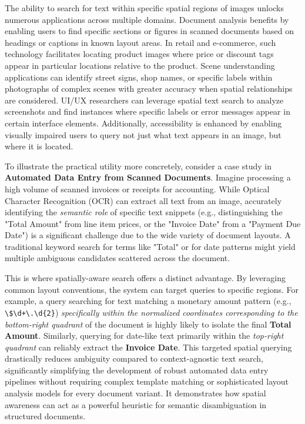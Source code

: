 \documentclass[sigconf,screen]{acmart}
\begin{document}
The ability to search for text within specific spatial regions of images unlocks numerous applications across multiple domains. Document analysis benefits by enabling users to find specific sections or figures in scanned documents based on headings or captions in known layout areas. In retail and e-commerce, such technology facilitates locating product images where price or discount tags appear in particular locations relative to the product. Scene understanding applications can identify street signs, shop names, or specific labels within photographs of complex scenes with greater accuracy when spatial relationships are considered. UI/UX researchers can leverage spatial text search to analyze screenshots and find instances where specific labels or error messages appear in certain interface elements. Additionally, accessibility is enhanced by enabling visually impaired users to query not just what text appears in an image, but where it is located.

To illustrate the practical utility more concretely, consider a case study in \textbf{Automated Data Entry from Scanned Documents}. Imagine processing a high volume of scanned invoices or receipts for accounting. While Optical Character Recognition (OCR) can extract all text from an image, accurately identifying the \textit{semantic role} of specific text snippets (e.g., distinguishing the "Total Amount" from line item prices, or the "Invoice Date" from a "Payment Due Date") is a significant challenge due to the wide variety of document layouts. A traditional keyword search for terms like "Total" or for date patterns might yield multiple ambiguous candidates scattered across the document.

This is where spatially-aware search offers a distinct advantage. By leveraging common layout conventions, the system can target queries to specific regions. For example, a query searching for text matching a monetary amount pattern (e.g., \verb|\$\d+\.\d{2}|) \textit{specifically within the normalized coordinates corresponding to the bottom-right quadrant} of the document is highly likely to isolate the final \textbf{Total Amount}. Similarly, querying for date-like text primarily within the \textit{top-right quadrant} can reliably extract the \textbf{Invoice Date}. This targeted spatial querying drastically reduces ambiguity compared to context-agnostic text search, significantly simplifying the development of robust automated data entry pipelines without requiring complex template matching or sophisticated layout analysis models for every document variant. It demonstrates how spatial awareness can act as a powerful heuristic for semantic disambiguation in structured documents.
\end{document}
